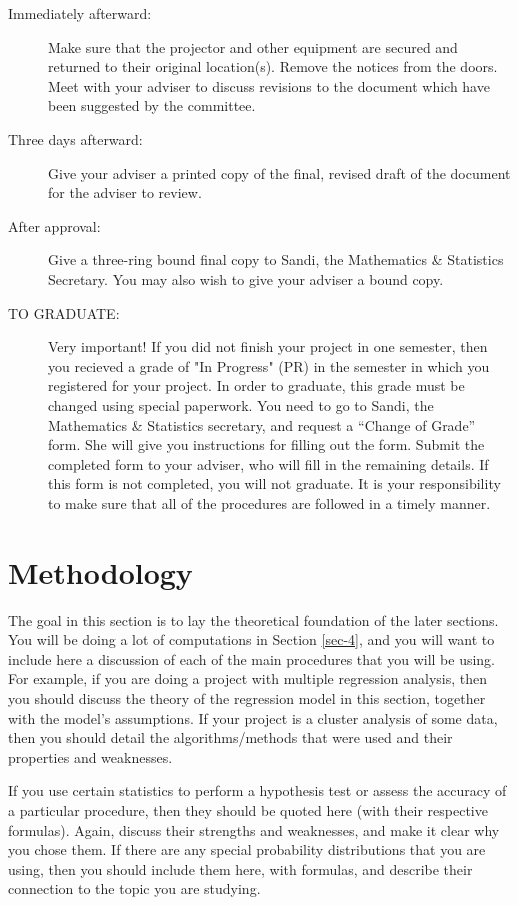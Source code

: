 \documentclass[11pt]{article}
\begin{document}
\begin{description}
\item[Immediately afterward:] Make sure that the projector and other
equipment are secured and returned to their original
location(s). Remove the notices from the doors. Meet with your
adviser to discuss revisions to the document which have been
suggested by the committee.

\item[Three days afterward:] Give your adviser a printed copy of the
final, revised draft of the document for the adviser to review.

\item[After approval:] Give a three-ring bound final copy to Sandi, the
Mathematics \& Statistics Secretary. You may also wish to give
your adviser a bound copy.

\item[TO GRADUATE:] Very important! If you did not finish your project
in one semester, then you recieved a grade of "In
Progress" (PR) in the semester in which you
registered for your project.  In order to graduate,
this grade must be changed using special
paperwork. You need to go to Sandi, the Mathematics
\& Statistics secretary, and request a “Change of
Grade” form. She will give you instructions for
filling out the form. Submit the completed form to
your adviser, who will fill in the remaining
details. If this form is not completed, you will not
graduate.  It is your responsibility to make sure
that all of the procedures are followed in a timely
manner.
\end{description}

\newpage

\section[Methodology]{Methodology}
\label{sec-3}

The goal in this section is to lay the theoretical foundation of the
later sections. You will be doing a lot of computations in Section
\ref{sec-4}, and you will want to include here a discussion of each
of the main procedures that you will be using.  For example, if you
are doing a project with multiple regression analysis, then you should
discuss the theory of the regression model in this section, together
with the model's assumptions. If your project is a cluster analysis of
some data, then you should detail the algorithms/methods that were
used and their properties and weaknesses.

If you use certain statistics to perform a hypothesis test or assess
the accuracy of a particular procedure, then they should be quoted
here (with their respective formulas). Again, discuss their strengths
and weaknesses, and make it clear why you chose them. If there are any
special probability distributions that you are using, then you should
include them here, with formulas, and describe their connection to the
topic you are studying.
\end{document}
